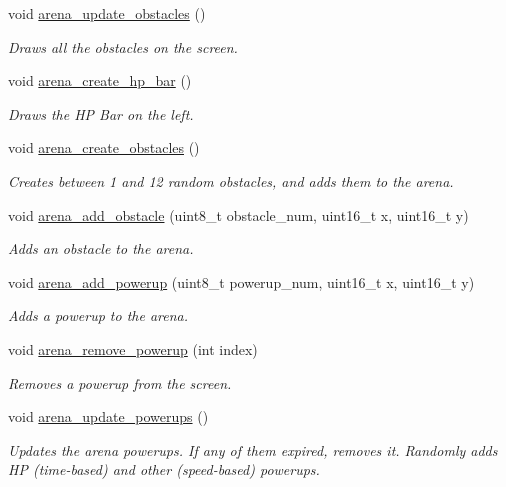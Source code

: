 \begin{DoxyCompactItemize}
\item 
void \mbox{\hyperlink{group__snake_ga4890845dc17bb18e466ffc2590f1d067}{arena\+\_\+update\+\_\+obstacles}} ()
\begin{DoxyCompactList}\small\item\em Draws all the obstacles on the screen. \end{DoxyCompactList}\item 
void \mbox{\hyperlink{group__snake_gafed6f3f803dcd50302e1e669d6646eca}{arena\+\_\+create\+\_\+hp\+\_\+bar}} ()
\begin{DoxyCompactList}\small\item\em Draws the HP Bar on the left. \end{DoxyCompactList}\item 
void \mbox{\hyperlink{group__snake_ga0023b72115390a70c136c27bcd0f7844}{arena\+\_\+create\+\_\+obstacles}} ()
\begin{DoxyCompactList}\small\item\em Creates between 1 and 12 random obstacles, and adds them to the arena. \end{DoxyCompactList}\item 
void \mbox{\hyperlink{group__snake_ga5b6ba10dffbae055f140e8793d279dbf}{arena\+\_\+add\+\_\+obstacle}} (uint8\+\_\+t obstacle\+\_\+num, uint16\+\_\+t x, uint16\+\_\+t y)
\begin{DoxyCompactList}\small\item\em Adds an obstacle to the arena. \end{DoxyCompactList}\item 
void \mbox{\hyperlink{group__snake_ga1aabc2d137486cd43e3cc49b528f9f67}{arena\+\_\+add\+\_\+powerup}} (uint8\+\_\+t powerup\+\_\+num, uint16\+\_\+t x, uint16\+\_\+t y)
\begin{DoxyCompactList}\small\item\em Adds a powerup to the arena. \end{DoxyCompactList}\item 
void \mbox{\hyperlink{group__snake_ga28f1d377ae0f0b900ce5dbe1ff0f64c3}{arena\+\_\+remove\+\_\+powerup}} (int index)
\begin{DoxyCompactList}\small\item\em Removes a powerup from the screen. \end{DoxyCompactList}\item 
void \mbox{\hyperlink{group__snake_gac5b60c5a2d1ca79c4983372122b5183a}{arena\+\_\+update\+\_\+powerups}} ()
\begin{DoxyCompactList}\small\item\em Updates the arena powerups. If any of them expired, removes it. Randomly adds HP (time-\/based) and other (speed-\/based) powerups. \end{DoxyCompactList}\item 

\end{DoxyCompactItemize}
